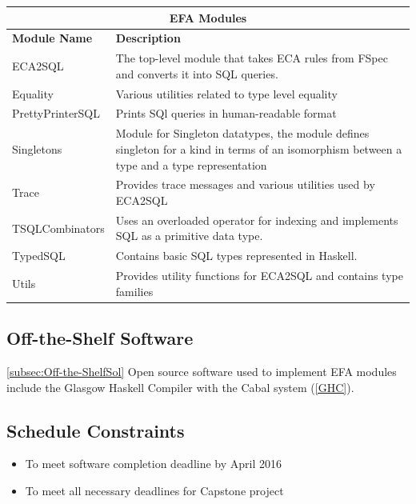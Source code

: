 \documentclass[12pt]{report}
\begin{document}
\begin{adjustbox}{center}
    \begin{tabular}{ |p{3.2cm}|p{11cm}|  }
        \hline
        \multicolumn{2}{|c|}{\bfseries{\large{EFA Modules}}} \\
        \hline\hline
        \bfseries{Module Name} & \bfseries{Description}\\
        \hline
        ECA2SQL & The top-level module that takes ECA rules from FSpec and 
        converts it into SQL queries.    \\ 
        \hline
        Equality & Various utilities related to type level equality   \\ 
        \hline
        PrettyPrinterSQL & Prints SQl queries in human-readable format    \\ 
        \hline
        Singletons & Module for Singleton datatypes, the module defines 
        singleton for a kind in terms of an isomorphism between a type and a 
        type representation   \\ 
        \hline
        Trace & Provides trace messages and various utilities used by 
        ECA2SQL    \\ 
        \hline
        TSQLCombinators & Uses an overloaded operator for indexing and 
        implements SQL as a primitive data type.   \\ 
        \hline
        TypedSQL & Contains basic SQL types represented in Haskell.    \\ 
        \hline
        Utils & Provides utility functions for ECA2SQL and contains type 
        families    \\ 
        \hline
    \end{tabular}
\end{adjustbox}
\subsection{Off-the-Shelf Software}\ref{subsec:Off-the-ShelfSol}
Open source software used to implement EFA modules include the Glasgow Haskell 
Compiler with the Cabal system (\ref{GHC}). 

\subsection{Schedule Constraints}
\begin{itemize}
    \item To meet software completion deadline by April 2016
    \item To meet all necessary deadlines for Capstone project 
\end{itemize}
\end{document}
